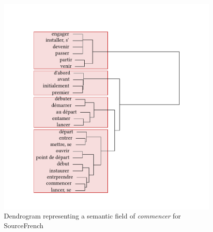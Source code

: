 \begin{figure}
\includegraphics[width=\textwidth]{figures/tree91.pdf}
\caption{\label{fig:4:88}Dendrogram representing a semantic field of \textit{commencer} for SourceFrench}
\end{figure}

